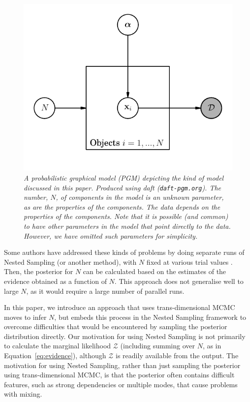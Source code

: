 \documentclass[letterpaper, 11pt]{article}
\begin{document}
\begin{figure}
\begin{center}
\includegraphics{pgm.pdf}
\caption{\it A probabilistic graphical model (PGM) depicting the kind
of model discussed in this paper. Produced using daft ({\tt daft-pgm.org}).
The number, $N$, of components in the model is an unknown parameter, as are the
properties of the components. The data depends on the properties of the components.
Note that it is possible (and common) to have other parameters in the model
that point directly to the data. However, we have omitted such parameters
for simplicity.
\label{fig:pgm}}
\end{center}
\end{figure}

Some authors have addressed these kinds of problems by
doing separate runs of Nested Sampling
(or another method),
with $N$ fixed at various trial values \citep[e.g.][]{fengji, feroz}.
Then, the posterior for $N$ can be calculated
based on the estimates of the evidence obtained as a function of $N$.
This approach does not generalise well to large $N$, as it would
require a large number of parallel runs.

In this paper, we introduce an approach that uses trans-dimensional MCMC moves
to infer $N$, but embeds this process in the Nested Sampling framework to
overcome difficulties that would be encountered by sampling the posterior
distribution directly. Our motivation
for using Nested Sampling is not primarily to calculate the marginal
likelihood $\mathcal{Z}$ (including summing over $N$, as in
Equation~\ref{eq:evidence}),
although $\mathcal{Z}$ is readily available from the output.
The motivation for using Nested Sampling, rather than just sampling the
posterior using trans-dimensional MCMC, is that the posterior often contains
difficult features, such as strong dependencies or multiple modes, that cause
problems with mixing.
\end{document}
